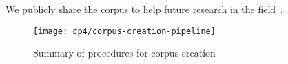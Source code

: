 We publicly share the corpus to help future research in the field~\cite{supplementary_material}.



\begin{figure}
    \centering
    \texttt{[image: cp4/corpus-creation-pipeline]}
    \caption{Summary of procedures for corpus creation}
    \label{fig:corpus-creation-pipeline}
\end{figure}













